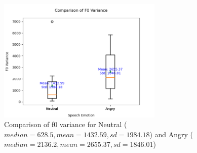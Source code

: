 \documentclass{../labbook}
\begin{document}
\begin{solution}
\begin{figure}[!h]
    \centering
    \includegraphics[width=0.7\textwidth]{5thM.png}
    \caption{Comparison of f0 variance for Neutral ($median=628.5, mean=1432.59, sd=1984.18$) and Angry ($median=2136.2, mean=2655.37, sd=1846.01$)}
\end{figure}


\end{solution}
\end{document}

